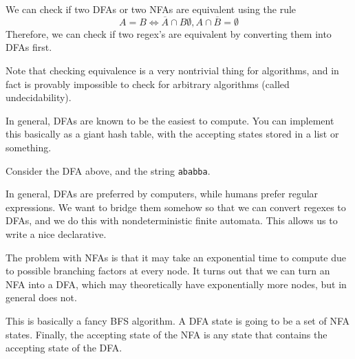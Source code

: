   \begin{theorem}
    We can check if two DFAs or two NFAs are equivalent using the rule 
    \begin{equation}
      A = B \iff \overline{A} \cap B \emptyset, A \cap \overline{B} = \emptyset
    \end{equation}
    Therefore, we can check if two regex's are equivalent by converting them into DFAs first. 
  \end{theorem}

  Note that checking equivalence is a very nontrivial thing for algorithms, and in fact is provably impossible to check for arbitrary algorithms (called undecidability). 

  In general, DFAs are known to be the easiest to compute. You can implement this basically as a giant hash table, with the accepting states stored in a list or something. 

  \begin{example}
    Consider the DFA above, and the string \texttt{ababba}. 
  \end{example}

  In general, DFAs are preferred by computers, while humans prefer regular expressions. We want to bridge them somehow so that we can convert regexes to DFAs, and we do this with nondeterministic finite automata. This allows us to write a nice declarative. 

  The problem with NFAs is that it may take an exponential time to compute due to possible branching factors at every node. It turns out that we can turn an NFA into a DFA, which may theoretically have exponentially more nodes, but in general does not. 

  \begin{algo}
    This is basically a fancy BFS algorithm. A DFA state is going to be a set of NFA states. Finally, the accepting state of the NFA is any state that contains the accepting state of the DFA. 
  \end{algo}

